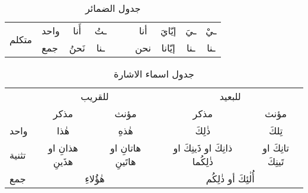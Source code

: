 \documentclass[../main.tex]{subfiles}
\begin{document}
\begin{table}[H]
\begin{tabular}{lll|ccccc|cc|c|}
\multicolumn{2}{|l|}{\multirow{2}{*}{متكلم}}                                             & واحد  & \multicolumn{1}{c|}{أَنا}                   & \multicolumn{1}{c|}{ـتُ}    & \multicolumn{1}{c|}{}      & \multicolumn{1}{c|}{}    & أنا   & \multicolumn{1}{c|}{إيّايَ}    & ـيَ    & ـيْ    \\ \cline{3-11} 
\multicolumn{2}{|l|}{}                                                                   & جمع   & \multicolumn{1}{c|}{نَحنُ}                  & \multicolumn{1}{c|}{ـنا}    & \multicolumn{1}{c|}{}      & \multicolumn{1}{c|}{}    & نحن   & \multicolumn{1}{c|}{إيّانا}    & ـنا    & ـنا    \\ \hline
\end{tabular}
\caption{جدول الضمائر}
\label{table:dameer}
\end{table}


\begin{table}[H]
\centering
\begin{tabular}{lcccc}
                           & \multicolumn{2}{c}{للقريب}                                                    & \multicolumn{2}{c}{للبعيد}                                                                  \\
                           & مذكر                                 & مؤنث                                   & مذكر                                               & مؤنث                                   \\ \cline{2-5} 
\multicolumn{1}{l|}{واحد}  & \multicolumn{1}{c|}{هٰذا}            & \multicolumn{1}{c|}{هٰذهِ}             & \multicolumn{1}{c|}{ذٰلِكَ}                        & \multicolumn{1}{c|}{تِلكَ}             \\ \cline{2-5} 
\multicolumn{1}{l|}{تثنية} & \multicolumn{1}{c|}{هذانِ او هذَينِ} & \multicolumn{1}{c|}{هاتانِ او هاتَينِ} & \multicolumn{1}{c|}{ذانِكَ او ذَينِكَ او ذٰلِكُما} & \multicolumn{1}{c|}{تانِكَ او تَينِكَ} \\ \cline{2-5} 
\multicolumn{1}{l|}{جمع}   & \multicolumn{2}{c|}{هٰؤُلاءِ}                                                 & \multicolumn{2}{c|}{أُلٰئِكَ أو ذٰلِكُم}                                                    \\ \cline{2-5} 
\end{tabular}
\caption{جدول اسماء الاشارة}
\label{table:ishara}
\end{table}
\end{document}
